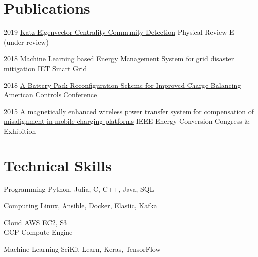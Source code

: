 \documentclass{tccv}
\begin{document}
\section{Publications}
\begin{yearlist}
	\item{2019}
	{\href{htts://arxiv.org}{Katz-Eigenvector Centrality Community Detection}}
	{Physical Review E (under review)}
	
	\item{2018}
	{\href{https://digital-library.theiet.org/content/journals/10.1049/iet-stg.2018.0043}{Machine Learning based Energy Management System for grid disaster mitigation}}
	{IET Smart Grid}
	
	\item{2018}
	{\href{https://ieeexplore.ieee.org/document/8431612}{A Battery Pack Reconfiguration Scheme for Improved Charge Balancing}}
	{American Controls Conference}
	
	\item{2015}
	{\href{http://ieeexplore.ieee.org/document/7309840/}{A magnetically enhanced wireless power transfer system for compensation of misalignment in mobile charging platforms}}
	{IEEE Energy Conversion Congress \& Exhibition}
	
\end{yearlist}

\section{Technical Skills}

\begin{factlist}

\item{Programming}
    {Python, Julia, C, C++, Java, SQL}
    
\item{Computing}
     {Linux, Ansible, Docker, Elastic, Kafka}
     
\item{Cloud}
    {AWS EC2, S3\\
    GCP Compute Engine}

\item{Machine Learning}
     {SciKit-Learn, Keras, TensorFlow}


\end{factlist}
\end{document}
